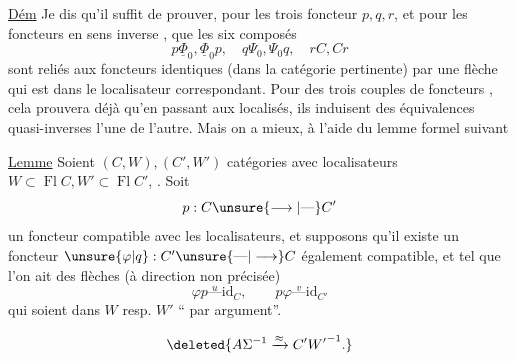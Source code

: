 
\uline{Dém} Je dis qu'il suffit de prouver, pour les trois foncteur $p,q,r$, et pour les foncteurs en sens inverse
, que les six composés
\[
p\underline{\Phi}_0,\underline{\Phi}_0p,\quad q\Psi_0,\Psi_0q,\quad rC,Cr
\]
sont reliés aux foncteurs identiques (dans la catégorie pertinente) par une flèche qui est dans le localisateur  correspondant. Pour  des trois couples de foncteurs , cela prouvera déjà qu'en passant aux localisés,  ils induisent des équivalences quasi-inverses l'une de l'autre. Mais on a mieux, à l'aide du lemme formel suivant

\uline{Lemme} Soient $(C,W),(C',W')$   catégories avec localisateurs $W\subset\operatorname{Fl}C,W'\subset\operatorname{Fl}C'$, . Soit
\[ p:C\unsure{\longrightarrow|\text{---}}C' \]
un foncteur compatible avec les localisateurs, et supposons qu'il existe un foncteur $\unsure{\varphi|q}:C'\unsure{\text{---}|\longrightarrow}C$ également compatible, et tel que  l'on ait des flèches (à direction non précisée)
\[ \varphi p\overset{u}{\text{---}}\mathrm{id}_C,\qquad p\varphi\overset{v}{\text{---}}\mathrm{id}_{C'} \]
qui soient dans $W$ resp. $W'$ `` par argument''.



\[ \deleted{A\Sigma^{-1}\xrightarrow{\approx} C'{W'}^{-1}.} \]

